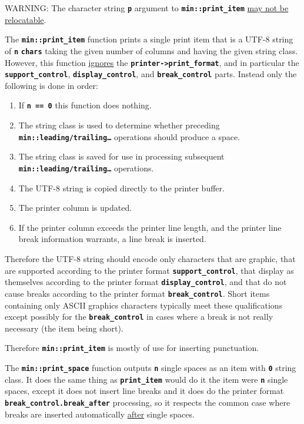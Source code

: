 \documentclass[12pt]{article}
\newcommand{\TT}[1]{{\tt \bfseries #1}}
\newcommand{\EOL}{\penalty \exhyphenpenalty}
\begin{document}
WARNING: The character string \TT{p} argument to \TT{min::\EOL print\_\EOL item}
\underline{may not be relocatable}.

The \TT{min::print\_item} function prints a single print item
that is a UTF-8 string of \TT{n} \TT{chars} taking the given
number of columns and having the given string class.  However,
this function \underline{ignores} the \TT{printer->\EOL print\_\EOL format},
and in particular the \TT{support\_\EOL control},
\TT{display\_\EOL control}, and \TT{break\_\EOL control} parts.
Instead only the following is done in order:

\begin{enumerate}
\item If \TT{n == 0} this function does nothing.
\item The string class is used to determine whether preceding
\TT{min::\EOL leading/\EOL trailing\ldots} operations should
produce a space.
\item The string class is saved for use in processing subsequent
\TT{min::\EOL leading/\EOL trailing\ldots} operations.
\item The UTF-8 string is copied directly to the printer buffer.
\item The printer column is updated.
\item If the printer column exceeds the printer line length,
and the printer line break information warrants, a line break
is inserted.
\end{enumerate}

Therefore the UTF-8 string should encode only characters
that are graphic, that are supported according to
the printer format \TT{support\_\EOL control},
that display as themselves according to the
printer format \TT{display\_\EOL control},
and that do not cause breaks according to the
printer format \TT{break\_\EOL control}.
Short items containing only ASCII graphics characters
typically meet these qualifications except possibly for
the \TT{break\_\EOL control} in cases where a break is not
really necessary (the item being short).

Therefore \TT{min::print\_item} is mostly of use for inserting
punctuation.

The \TT{min::print\_space} function outputs \TT{n} single spaces
as an item with \TT{0} string class.  It does the same thing
as \TT{print\_item} would do it the item were \TT{n} single spaces,
except it does not insert line breaks and it does do the
printer format \TT{break\_\EOL control.break\_\EOL after}
processing, so it respects the common case where breaks are inserted
automatically \underline{after} single spaces.
\end{document}
